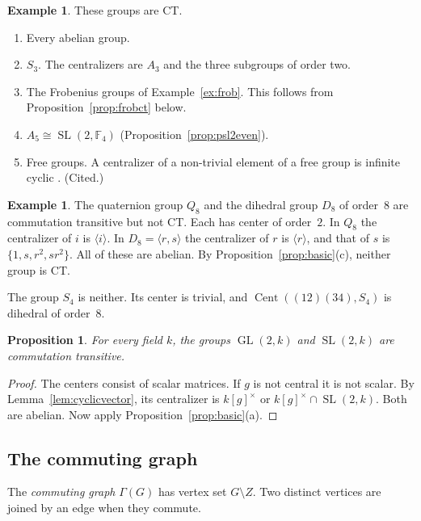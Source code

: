 \documentclass[12pt,letterpaper]{article}
\numberwithin{equation}{section}
\theoremstyle{plain}
\newtheorem{proposition}[theorem]{Proposition}
\theoremstyle{definition}
\newtheorem{example}[theorem]{Example}
\newcommand{\F}{\mathbb{F}}
\DeclareMathOperator{\Cent}{Cent}
\DeclareMathOperator{\GL}{GL}
\DeclareMathOperator{\SL}{SL}
\begin{document}
\begin{example}\label{ex:ctexamples}
These groups are CT.
\begin{enumerate}[itemsep=1pt]
\item Every abelian group.
\item $S_3$. The centralizers are $A_3$ and the three subgroups of order
  two.
\item The Frobenius groups of Example~\ref{ex:frob}. This follows from
  Proposition~\ref{prop:frobct} below.
\item $A_5\cong\SL(2,\F_4)$ (Proposition~\ref{prop:psl2even}).
\item Free groups. A centralizer of a non-trivial element of a free group is
  infinite cyclic \cite{LR86,FGRS15}. (Cited.)
\end{enumerate}
\end{example}

\begin{example}\label{ex:nonct}
The quaternion group $Q_8$ and the dihedral group $D_8$ of order~$8$ are
commutation transitive but not CT. Each has center of order~$2$. In $Q_8$
the centralizer of $i$ is $\langle i\rangle$. In $D_8=\langle r,s\rangle$
the centralizer of $r$ is $\langle r\rangle$, and that of $s$ is
$\{1,s,r^2,sr^2\}$. All of these are abelian. By
Proposition~\ref{prop:basic}(c), neither group is CT.

The group $S_4$ is neither. Its center is trivial, and
$\Cent((12)(34),S_4)$ is dihedral of order~$8$.
\end{example}

\begin{proposition}\label{prop:gl2}
For every field $k$, the groups $\GL(2,k)$ and $\SL(2,k)$ are commutation
transitive.
\end{proposition}

\begin{proof}
The centers consist of scalar matrices. If $g$ is not central it is not
scalar. By Lemma~\ref{lem:cyclicvector}, its centralizer is $k[g]^\times$
or $k[g]^\times\cap\SL(2,k)$. Both are abelian. Now apply
Proposition~\ref{prop:basic}(a).
\end{proof}

\subsection{The commuting graph}\label{sec:graph}

The \emph{commuting graph} $\Gamma(G)$ has vertex set $G\setminus Z$. Two
distinct vertices are joined by an edge when they commute.
\end{document}
